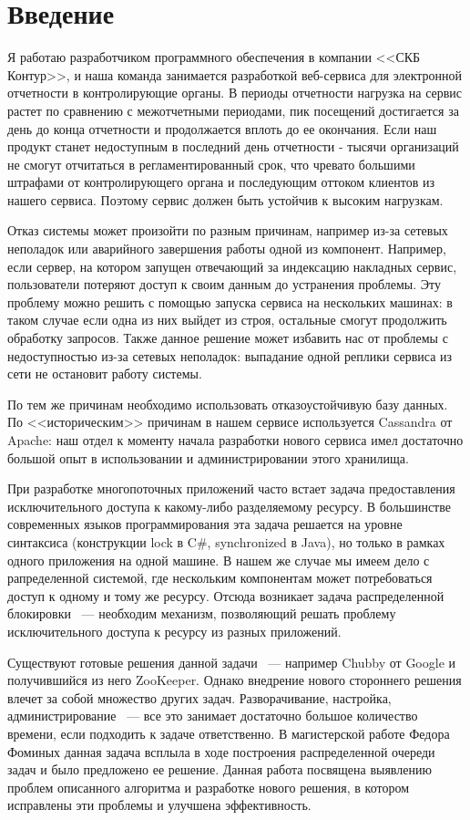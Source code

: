 \section{Введение}

Я работаю разработчиком программного обеспечения в компании <<СКБ Контур>>, и наша команда занимается разработкой веб-сервиса для электронной отчетности в контролирующие органы. В периоды отчетности нагрузка на сервис растет по сравнению с межотчетными периодами, пик посещений достигается за день до конца отчетности и продолжается вплоть до ее окончания. Если наш продукт станет недоступным в последний день отчетности - тысячи организаций не смогут отчитаться в регламентированный срок, что чревато большими штрафами от контролирующего органа и последующим оттоком клиентов из нашего сервиса. Поэтому сервис должен быть устойчив к высоким нагрузкам.

Отказ системы может произойти по разным причинам, например из-за сетевых неполадок или аварийного завершения работы одной из компонент. Например, если сервер, на котором запущен отвечающий за индексацию накладных сервис, пользователи потеряют доступ к своим данным до устранения проблемы. Эту проблему можно решить с помощью запуска сервиса на нескольких машинах: в таком случае если одна из них выйдет из строя, остальные смогут продолжить обработку запросов. Также данное решение может избавить нас от проблемы с недоступностью из-за сетевых неполадок: выпадание одной реплики сервиса из сети не остановит работу системы.

По тем же причинам необходимо использовать отказоустойчивую базу данных. По <<историческим>> причинам в нашем сервисе используется Cassandra от Apache: наш отдел к моменту начала разработки нового сервиса имел достаточно большой опыт в использовании и администрировании этого хранилища.

При разработке многопоточных приложений часто встает задача предоставления исключительного доступа к какому-либо разделяемому ресурсу. В большинстве современных языков программирования эта задача решается на уровне синтаксиса (конструкции lock в C\#, synchronized в Java), но только в рамках одного приложения на одной машине. В нашем же случае мы имеем дело с рапределенной системой, где нескольким компонентам может потребоваться доступ к одному и тому же ресурсу. Отсюда возникает задача распределенной блокировки ~--- необходим механизм, позволяющий решать проблему исключительного доступа к ресурсу из разных приложений.

Существуют готовые решения данной задачи ~--- например Chubby от Google и получившийся из него ZooKeeper. Однако внедрение нового стороннего решения влечет за собой множество других задач. Разворачивание, настройка, администрирование ~--- все это занимает достаточно большое количество времени, если подходить к задаче ответственно. В магистерской работе Федора Фоминых данная задача всплыла в ходе построения распределенной очереди задач и было предложено ее решение. Данная работа посвящена выявлению проблем описанного алгоритма и разработке нового решения, в котором исправлены эти проблемы и улучшена эффективность.